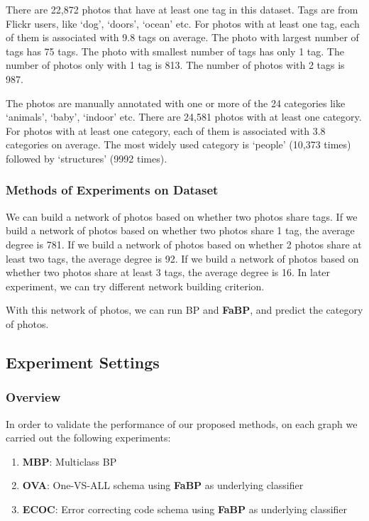 There are 22,872 photos that have at least one tag in this dataset. Tags are from Flickr users, like ‘dog’, ‘doors’, ‘ocean’ etc. For photos with at least one tag, each of them is associated with 9.8 tags on average. The photo with largest number of tags has 75 tags. The photo with smallest number of tags has only 1 tag. The number of photos only with 1 tag is 813. The number of photos with 2 tags is 987.

The photos are manually annotated with one or more of the 24 categories like ‘animals’, ‘baby’, ‘indoor’ etc. There are 24,581 photos with at least one category. For photos with at least one category, each of them is associated with 3.8 categories on average.  The most widely used category is ‘people’ (10,373 times) followed by ‘structures’ (9992 times). 

\subsubsection*{Methods of Experiments on Dataset}
We can build a network of photos based on whether two photos share tags. If we build a network of photos based on whether two photos share 1 tag, the average degree is 781. If we build a network of photos based on whether 2 photos share at least two tags, the average degree is 92. If we build a network of photos based on whether two photos share at least 3 tags, the average degree is 16. In later experiment, we can try different network building criterion.

With this network of photos, we can run BP and \textbf{FaBP}, and predict the category of photos.


\subsection{Experiment Settings}
\subsubsection*{Overview}
In order to validate the performance of our proposed methods, on each graph we carried out the following experiments:
\begin{enumerate}
	\item \textbf{MBP}: Multiclass BP
	\item \textbf{OVA}: One-VS-ALL schema using \textbf{FaBP} as underlying classifier
	\item \textbf{ECOC}: Error correcting code schema using \textbf{FaBP} as underlying classifier
\end{enumerate}

